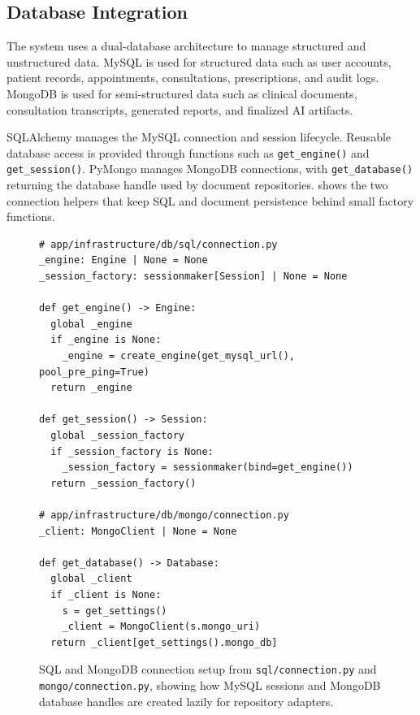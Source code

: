 \subsection{Database Integration}
\label{subsec:database-integration}

The system uses a dual-database architecture to manage structured and unstructured data. MySQL is used for structured data such as user accounts, patient records, appointments, consultations, prescriptions, and audit logs. MongoDB is used for semi-structured data such as clinical documents, consultation transcripts, generated reports, and finalized AI artifacts.

SQLAlchemy manages the MySQL connection and session lifecycle. Reusable database access is provided through functions such as \texttt{get\_engine()} and \texttt{get\_session()}. PyMongo manages MongoDB connections, with \texttt{get\_database()} returning the database handle used by document repositories.  shows the two connection helpers that keep SQL and document persistence behind small factory functions.

\begin{figure}[htbp]
\centering
\begin{minipage}{0.92\textwidth}
\begin{verbatim}
# app/infrastructure/db/sql/connection.py
_engine: Engine | None = None
_session_factory: sessionmaker[Session] | None = None

def get_engine() -> Engine:
  global _engine
  if _engine is None:
    _engine = create_engine(get_mysql_url(), pool_pre_ping=True)
  return _engine

def get_session() -> Session:
  global _session_factory
  if _session_factory is None:
    _session_factory = sessionmaker(bind=get_engine())
  return _session_factory()

# app/infrastructure/db/mongo/connection.py
_client: MongoClient | None = None

def get_database() -> Database:
  global _client
  if _client is None:
    s = get_settings()
    _client = MongoClient(s.mongo_uri)
  return _client[get_settings().mongo_db]
\end{verbatim}
\end{minipage}
\caption{SQL and MongoDB connection setup from \texttt{sql/connection.py} and \texttt{mongo/connection.py}, showing how MySQL sessions and MongoDB database handles are created lazily for repository adapters.}
\label{fig:implementation-database-connection-setup}
\end{figure}
\FloatBarrier

